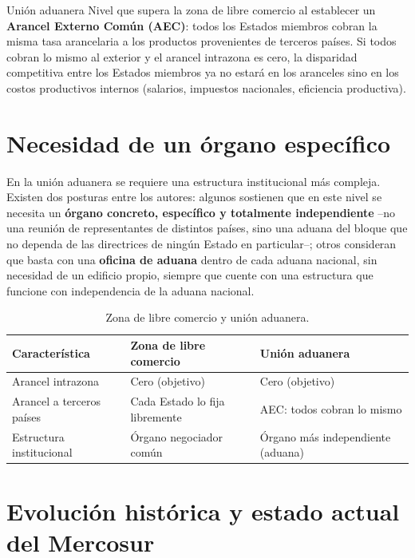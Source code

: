 \documentclass[12pt,oneside]{book}
\begin{document}
\begin{definicion}{Unión aduanera}
Nivel que supera la zona de libre comercio al establecer un \textbf{Arancel Externo Común (AEC)}: todos los Estados miembros cobran la misma tasa arancelaria a los productos provenientes de terceros países. Si todos cobran lo mismo al exterior y el arancel intrazona es cero, la disparidad competitiva entre los Estados miembros ya no estará en los aranceles sino en los costos productivos internos (salarios, impuestos nacionales, eficiencia productiva).
\end{definicion}

\section{Necesidad de un órgano específico}

En la unión aduanera se requiere una estructura institucional más compleja. Existen dos posturas entre los autores: algunos sostienen que en este nivel se necesita un \textbf{órgano concreto, específico y totalmente independiente} --no una reunión de representantes de distintos países, sino una aduana del bloque que no dependa de las directrices de ningún Estado en particular--; otros consideran que basta con una \textbf{oficina de aduana} dentro de cada aduana nacional, sin necesidad de un edificio propio, siempre que cuente con una estructura que funcione con independencia de la aduana nacional.

\begin{table}[H]
\centering
\renewcommand{\arraystretch}{1.3}
\begin{tabularx}{\textwidth}{>{\raggedright\arraybackslash}p{}>{\raggedright\arraybackslash}X>{\raggedright\arraybackslash}X}
\toprule
\textbf{Característica} & \textbf{Zona de libre comercio} & \textbf{Unión aduanera} \\
\midrule
Arancel intrazona & Cero (objetivo) & Cero (objetivo) \\
Arancel a terceros países & Cada Estado lo fija libremente & AEC: todos cobran lo mismo \\
Estructura institucional & Órgano negociador común & Órgano más independiente (aduana) \\
\bottomrule
\end{tabularx}
\caption{Zona de libre comercio y unión aduanera.}
\end{table}

\section{Evolución histórica y estado actual del Mercosur}
\end{document}
